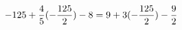 \documentclass[preview]{standalone}
\begin{document}
\begin{align*}
\special{dvisvgm:raw <g id='unique000'>}-125 + \frac{4}{5} (- \frac{125}{2}) - 8 = 9 + 3(- \frac{125}{2}) - \frac{9}{2}\special{dvisvgm:raw </g>}
\end{align*}
\end{document}
